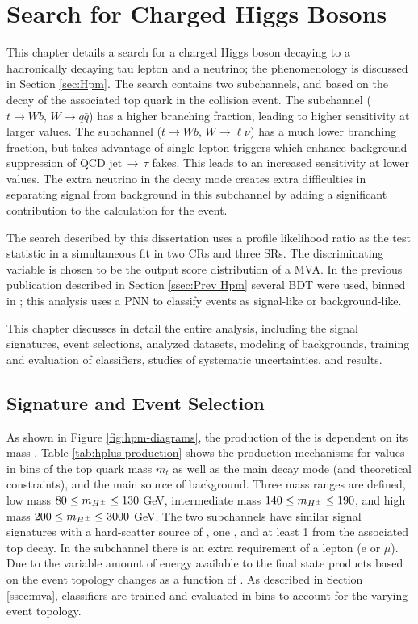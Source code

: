 \chapter{Search for Charged Higgs Bosons}\label{chap:hpana}
	This chapter details a search for a charged Higgs boson decaying to a hadronically decaying tau lepton and a neutrino; the phenomenology is discussed in Section \ref{sec:Hpm}. The search contains two subchannels, \taujets and \taulep based on the decay of the associated top quark in the collision event. The \taujets subchannel ($t\to Wb, \, W \to q\bar{q}$)  has a higher branching fraction, leading to higher sensitivity at larger \mHpm values. The \taulep subchannel ($t\to Wb, \, W \to \ell \nu$)  has a much lower branching fraction, but takes advantage of single-lepton triggers which enhance background suppression of \acrshort{QCD} $\mathrm{jet} \, \to \, \tau$ fakes. This leads to an increased sensitivity at lower \mHpm values. The extra neutrino in the \taulep decay mode creates extra difficulties in separating signal from background in this subchannel by adding a significant contribution to the \Etm calculation for the event. 

	The search described by this dissertation uses a profile likelihood ratio as the test statistic in a simultaneous fit in two \glspl{CR} and three \glspl{SR}. The discriminating variable is chosen to be the output score distribution of a \gls{MVA}. In the previous publication described in Section \ref{ssec:Prev Hpm} several \gls{BDT} were used, binned in \mHpm; this analysis uses a \gls{PNN} to classify events as signal-like or background-like.

	This chapter discusses in detail the entire analysis, including the signal signatures, event selections, analyzed datasets, modeling of backgrounds, training and evaluation of classifiers, studies of systematic uncertainties, and results.

	\section{Signature and Event Selection}\label{sec:signal}
		As shown in Figure \ref{fig:hpm-diagrams}, the production of the \Hpm is dependent on its mass \mHpm. Table \ref{tab:hplus-production} shows the production mechanisms for \mHpm values in bins of the top quark mass $m_t$ as well as the main decay mode (and theoretical constraints), and the main source of background. Three mass ranges are defined, low mass $80 \leq m_{H^{\pm}} \leq 130 $ GeV, intermediate mass $140 \leq m_{H^{\pm}} \leq 190$, and high mass $200 \leq m_{H^{\pm}} \leq 3000$ GeV.  The two subchannels have similar signal signatures with a hard-scatter source of \Etm, one \tauhad, and at least 1 \bjet from the associated top decay. In the \taulep subchannel there is an extra requirement of a lepton (e or $\mu$). Due to the variable amount of energy available to the final state products based on \mHpm the event topology changes as a function of \mHpm. As described in Section \ref{ssec:mva}, classifiers are trained and evaluated in \mHpm bins to account for the varying event topology.


